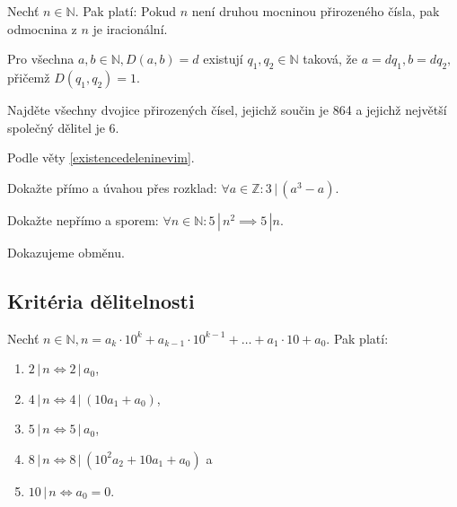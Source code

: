 \begin{veta}
  Nechť $n\in \mathbb N.$ Pak platí: Pokud $n$ není druhou mocninou přirozeného čísla, pak odmocnina z $n$ je iracionální.
\end{veta}

\begin{veta}\label{existencedeleninevim}
    Pro všechna $a,b \in \mathbb N, D(a,b)=d$ existují $q_1, q_2\in \mathbb N$ taková,
    že $a=dq_1, b=dq_2, $ přičemž $D(q_1, q_2)=1.$
\end{veta}

\begin{priklad}
Najděte všechny dvojice přirozených čísel, jejichž součin je 864 a jejichž největší společný dělitel je 6.
\end{priklad}

\begin{reseni}
Podle věty \ref{existencedeleninevim}.
\end{reseni}

\begin{priklad}
Dokažte přímo a úvahou přes rozklad: $\forall a \in \mathbb Z: 3\, | \, (a^3-a).$
\end{priklad}

\begin{priklad}
Dokažte nepřímo a sporem: $\forall n \in \mathbb N: 5 \, | \, n^2 \implies 5 \, | n.$
\end{priklad}

\begin{reseni}
Dokazujeme obměnu.
\end{reseni}

\subsection*{Kritéria dělitelnosti}
\begin{veta}
  Nechť $n\in \mathbb N, n=a_k\cdot 10^k+a_{k-1}\cdot 10^{k-1}+\dots + a_1\cdot 10 + a_0.$ Pak platí:
  \begin{enumerate}[$i.$]
    \item $2 \, | \, n \iff 2 \, | \, a_0$,
    \item $4 \, | \, n \iff 4 \, | \, (10a_1 + a_0)$,
    \item $5 \, | \, n \iff 5 \, | \, a_0$,
    \item $8 \, | \, n \iff 8 \, | \, (10^2a_2 + 10a_1 + a_0)$ a
    \item $10 \, | \, n \iff a_0 = 0$.
  \end{enumerate}
\end{veta}

